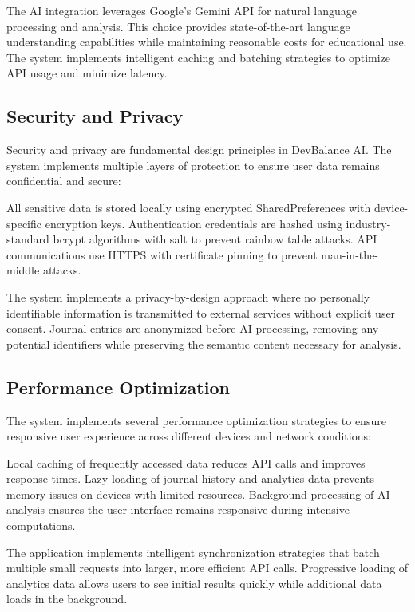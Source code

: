 \documentclass[conference,10pt]{IEEEtran}
\begin{document}
The AI integration leverages Google's Gemini API for natural language processing and analysis. This choice provides state-of-the-art language understanding capabilities while maintaining reasonable costs for educational use. The system implements intelligent caching and batching strategies to optimize API usage and minimize latency.

\subsection{Security and Privacy}

Security and privacy are fundamental design principles in DevBalance AI. The system implements multiple layers of protection to ensure user data remains confidential and secure:

All sensitive data is stored locally using encrypted SharedPreferences with device-specific encryption keys. Authentication credentials are hashed using industry-standard bcrypt algorithms with salt to prevent rainbow table attacks. API communications use HTTPS with certificate pinning to prevent man-in-the-middle attacks.

The system implements a privacy-by-design approach where no personally identifiable information is transmitted to external services without explicit user consent. Journal entries are anonymized before AI processing, removing any potential identifiers while preserving the semantic content necessary for analysis.

\subsection{Performance Optimization}

The system implements several performance optimization strategies to ensure responsive user experience across different devices and network conditions:

Local caching of frequently accessed data reduces API calls and improves response times. Lazy loading of journal history and analytics data prevents memory issues on devices with limited resources. Background processing of AI analysis ensures the user interface remains responsive during intensive computations.

The application implements intelligent synchronization strategies that batch multiple small requests into larger, more efficient API calls. Progressive loading of analytics data allows users to see initial results quickly while additional data loads in the background.
\end{document}
